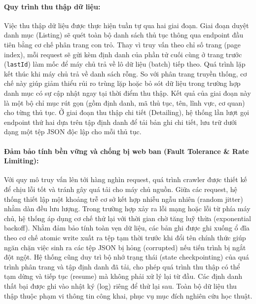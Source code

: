 \documentclass[11pt]{article}
\begin{document}
\paragraph{Quy trình thu thập dữ liệu: }
Việc thu thập dữ liệu được thực hiện tuần tự qua hai giai đoạn. Giai đoạn duyệt danh mục (Listing) sẽ quét toàn bộ danh sách thủ tục thông qua endpoint đầu tiên bằng cơ chế phân trang con trỏ. Thay vì truy vấn theo chỉ số trang (page index), mỗi request sẽ gửi kèm định danh của phần tử cuối cùng ở trang trước (\texttt{lastId}) làm mốc để máy chủ trả về lô dữ liệu (batch) tiếp theo. Quá trình lặp kết thúc khi máy chủ trả về danh sách rỗng. So với phân trang truyền thống, cơ chế này giúp giảm thiểu rủi ro trùng lặp hoặc bỏ sót dữ liệu trong trường hợp danh mục có sự cập nhật ngay tại thời điểm thu thập. Kết quả của giai đoạn này là một bộ chỉ mục rút gọn (gồm định danh, mã thủ tục, tên, lĩnh vực, cơ quan) cho từng thủ tục. Ở giai đoạn thu thập chi tiết (Detailing), hệ thống lần lượt gọi endpoint thứ hai dựa trên tập định danh để tải bản ghi chi tiết, lưu trữ dưới dạng một tệp JSON độc lập cho mỗi thủ tục.

\paragraph{Đảm bảo tính bền vững và chống bị web ban (Fault Tolerance \& Rate Limiting): } 
Với quy mô truy vấn lên tới hàng nghìn request, quá trình crawler được thiết kế để chịu lỗi tốt và tránh gây quá tải cho máy chủ nguồn. Giữa các request, hệ thống thiết lập một khoảng trễ cơ sở kết hợp nhiễu ngẫu nhiên (random jitter) nhằm dàn đều lưu lượng. Trong trường hợp xảy ra lỗi mạng hoặc lỗi từ phía máy chủ, hệ thống áp dụng cơ chế thử lại với thời gian chờ tăng luỹ thừa (exponential backoff). Nhằm đảm bảo tính toàn vẹn dữ liệu, các bản ghi được ghi xuống ổ đĩa theo cơ chế atomic write xuất ra tệp tạm thời trước khi đổi tên chính thức giúp ngăn chặn việc sinh ra các tệp JSON bị hỏng (corrupted) nếu tiến trình bị ngắt đột ngột. Hệ thống cũng duy trì bộ nhớ trạng thái (state checkpointing) của quá trình phân trang và tập định danh đã tải, cho phép quá trình thu thập có thể tạm dừng và tiếp tục (resume) mà không phải xử lý lại từ đầu. Các định danh thất bại được ghi vào nhật ký (log) riêng để thử lại sau. Toàn bộ dữ liệu thu thập thuộc phạm vi thông tin công khai, phục vụ mục đích nghiên cứu học thuật.
\end{document}
